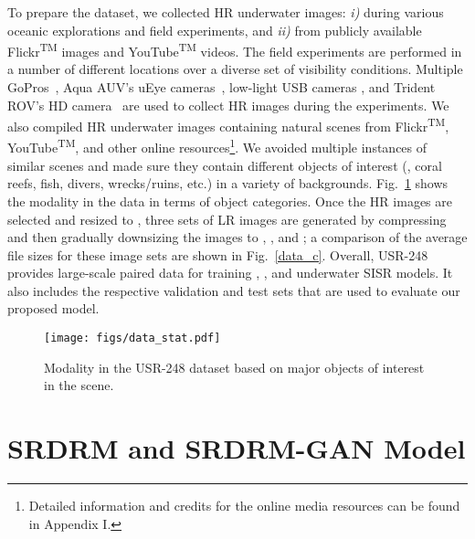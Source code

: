 \documentclass[10pt,twocolumn,letterpaper]{article}
\begin{document}
To prepare the dataset, we collected HR underwater images: \textit{i)} during various oceanic explorations and field experiments, and \textit{ii)} from publicly available Flickr\textsuperscript{TM} images and YouTube\textsuperscript{TM} videos. The field experiments are performed in a number of different locations over a diverse set of visibility conditions. 
Multiple GoPros~\cite{gopro}, Aqua AUV's uEye cameras~\cite{dudek2007aqua}, low-light USB cameras \cite{lowlight}, and Trident ROV's HD camera~\cite{trident} are used to collect HR images during the experiments. 
We also compiled HR underwater images containing natural scenes from Flickr\textsuperscript{TM}, YouTube\textsuperscript{TM}, and other online resources\footnote{Detailed information and credits for the online media resources can be found in Appendix I.}. We avoided multiple instances of similar scenes and made sure they contain different objects of interest (\eg, coral reefs, fish, divers, wrecks/ruins, etc.) in a variety of backgrounds. Fig.~\ref{fig:data_stat} shows the modality in the data in terms of object categories. Once the HR images are selected and resized to , three sets of LR images are generated by compressing and then gradually downsizing the images to , , and ; a comparison of the average file sizes for these image sets are shown in Fig.~\ref{data_c}. Overall, USR-248 provides large-scale paired data for training , , and  underwater SISR models. It also includes the respective validation and test sets that are used to evaluate our proposed model.    





\begin{figure}[hb]
	\centering
	\texttt{[image: figs/data\_stat.pdf]} 
	\vspace{-1mm}
	\caption{Modality in the USR-248 dataset based on major objects of interest in the scene.}
	\label{fig:data_stat}
\end{figure}





\section{SRDRM and SRDRM-GAN Model}
\end{document}

